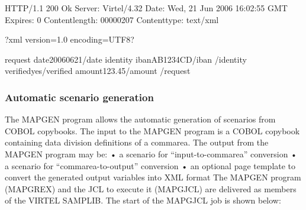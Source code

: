 \documentclass[letterpaper,10pt,english]{sphinxmanual}
\begin{document}
\begin{sphinxVerbatim}[commandchars=\\\{\}]
HTTP/1.1 200 Ok
Server: Virtel/4.32
Date: Wed, 21 Jun 2006 16:02:55 GMT
Expires: 0
Content\PYGZhy{}length: 00000207
Content\PYGZhy{}type: text/xml

\PYGZlt{}?xml version=\PYGZdq{}1.0\PYGZdq{} encoding=\PYGZdq{}UTF\PYGZhy{}8\PYGZdq{}?\PYGZgt{}

\PYGZlt{}request\PYGZgt{}
    \PYGZlt{}date\PYGZgt{}2006\PYGZhy{}06\PYGZhy{}21\PYGZlt{}/date\PYGZgt{}
    \PYGZlt{}identity\PYGZgt{}
        \PYGZlt{}iban\PYGZgt{}AB1234CD\PYGZlt{}/iban\PYGZgt{}
    \PYGZlt{}/identity\PYGZgt{}
    \PYGZlt{}verified\PYGZgt{}yes\PYGZlt{}/verified\PYGZgt{}
    \PYGZlt{}amount\PYGZgt{}\PYGZdl{}123.45\PYGZlt{}/amount\PYGZgt{}
\PYGZlt{}/request\PYGZgt{}
\end{sphinxVerbatim}



\subsubsection{Automatic scenario generation}
\label{\detokenize{User_Guide:automatic-scenario-generation}}

The MAPGEN program allows the automatic generation of scenarios from COBOL copybooks.
The input to the MAPGEN program is a COBOL copybook containing data division definitions of a commarea. The
output from the MAPGEN program may be:
• a scenario for “input-to-commarea” conversion
• a scenario for “commarea-to-output” conversion
• an optional page template to convert the generated output variables into XML format
The MAPGEN program (MAPGREX) and the JCL to execute it (MAPGJCL) are delivered as members of the VIRTEL
SAMPLIB. The start of the MAPGJCL job is shown below:
\end{document}
